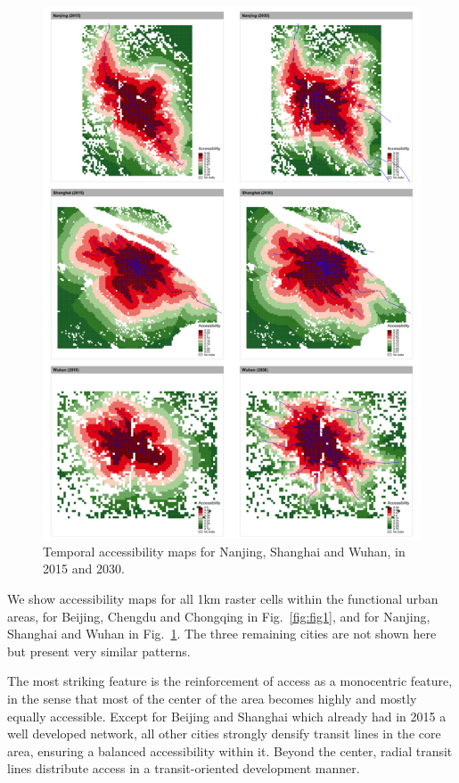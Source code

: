 \documentclass{article}
\begin{document}
\begin{figure}
	\includegraphics[width=\linewidth]{Fig1b.png}
	\caption{Temporal accessibility maps for Nanjing, Shanghai and Wuhan, in 2015 and 2030.\label{fig:fig2}}
\end{figure}

We show accessibility maps for all 1km raster cells within the functional urban areas, for Beijing, Chengdu and Chongqing in Fig.~\ref{fig:fig1}, and for Nanjing, Shanghai and Wuhan in Fig.~\ref{fig:fig2}. The three remaining cities are not shown here but present very similar patterns.

The most striking feature is the reinforcement of access as a monocentric feature, in the sense that most of the center of the area becomes highly and mostly equally accessible. Except for Beijing and Shanghai which already had in 2015 a well developed network, all other cities strongly densify transit lines in the core area, ensuring a balanced accessibility within it. Beyond the center, radial transit lines distribute access in a transit-oriented development manner.
\end{document}
